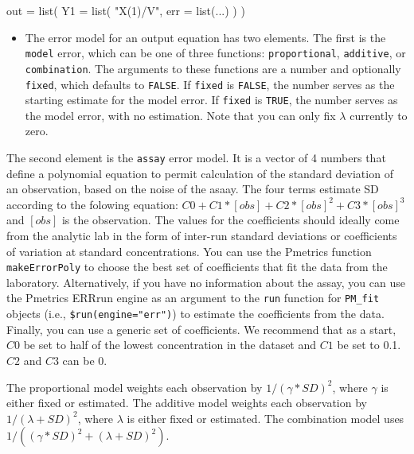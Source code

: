 \documentclass[
]{book}
\newenvironment{Shaded}{\begin{snugshade}}{\end{snugshade}}
\newcommand{\AttributeTok}[1]{\textcolor[rgb]{0.77,0.63,0.00}{#1}}
\newcommand{\FunctionTok}[1]{\textcolor[rgb]{0.00,0.00,0.00}{#1}}
\newcommand{\NormalTok}[1]{#1}
\newcommand{\OtherTok}[1]{\textcolor[rgb]{0.56,0.35,0.01}{#1}}
\newcommand{\StringTok}[1]{\textcolor[rgb]{0.31,0.60,0.02}{#1}}
\providecommand{\tightlist}{%
  \setlength{\itemsep}{0pt}\setlength{\parskip}{0pt}}
\begin{document}
\begin{Shaded}
\begin{Highlighting}[]
\NormalTok{out }\OtherTok{=} \FunctionTok{list}\NormalTok{(}
  \AttributeTok{Y1 =} \FunctionTok{list}\NormalTok{(}
    \StringTok{"X(1)/V"}\NormalTok{,}
    \AttributeTok{err =} \FunctionTok{list}\NormalTok{(...)}
\NormalTok{  )}
\NormalTok{)}
\end{Highlighting}
\end{Shaded}

\begin{itemize}
\tightlist
\item
  The error model for an output equation has two elements. The first is the \texttt{model} error, which can be one of three functions: \texttt{proportional}, \texttt{additive}, or \texttt{combination}. The arguments to these functions are a number and optionally \texttt{fixed}, which defaults to \texttt{FALSE}. If \texttt{fixed} is \texttt{FALSE}, the number serves as the starting estimate for the model error. If \texttt{fixed} is \texttt{TRUE}, the number serves as the model error, with no estimation. Note that you can only fix \(\lambda\) currently to zero.
\end{itemize}

The second element is the \texttt{assay} error model. It is a vector of 4 numbers that define a polynomial equation to permit calculation of the standard deviation of an observation, based on the noise of the asaay. The four terms estimate SD according to the folowing equation: \(C0 + C1 * [obs] + C2 * [obs]^2 + C3 * [obs]^3\) and \([obs]\) is the observation. The values for the coefficients should ideally come from the analytic lab in the form of inter-run standard deviations or coefficients of variation at standard concentrations. You can use the Pmetrics function \texttt{makeErrorPoly} to choose the best set of coefficients that fit the data from the
laboratory. Alternatively, if you have no information about the assay,
you can use the Pmetrics ERRrun engine as an argument to the \texttt{run} function for \texttt{PM\_fit} objects (i.e., \texttt{\$run(engine="err")}) to estimate the coefficients
from the data. Finally, you can use a generic set of coefficients. We
recommend that as a start, \(C0\) be set to half of the lowest
concentration in the dataset and \(C1\) be set to 0.1. \(C2\) and \(C3\) can
be 0.

The proportional model weights each observation by \(1/(\gamma * SD)^2\), where \(\gamma\) is either fixed or estimated. The additive model weights each observation by \(1/(\lambda + SD)^2\), where \(\lambda\) is either fixed or estimated. The combination model uses \(1/((\gamma * SD)^2 + (\lambda + SD)^2)\).
\end{document}
